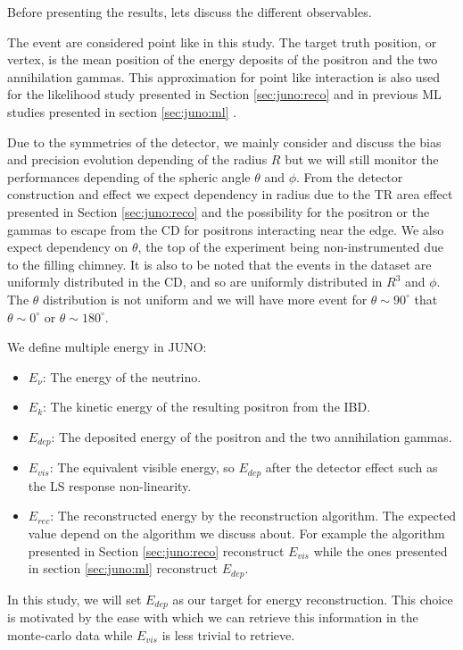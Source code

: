 \documentclass[../main.tex]{subfiles}
\begin{document}
Before presenting the results, lets discuss the different observables.

The event are considered point like in this study. The target truth position, or vertex, is the mean position of the energy deposits of the positron and the two annihilation gammas. This approximation for point like interaction is also used for the likelihood study presented in Section \ref{sec:juno:reco} and in previous ML studies presented in section \ref{sec:juno:ml} \cite{qian_vertex_2021}.

Due to the symmetries of the detector, we mainly consider and discuss the bias and precision evolution depending of the radius $R$ but we will still monitor the performances depending of the spheric angle $\theta$ and $\phi$. From the detector construction and effect we expect dependency in radius due to the TR area effect presented in Section \ref{sec:juno:reco} and the possibility for the positron or the gammas to escape from the CD for positrons interacting near the edge. We also expect dependency on $\theta$, the top of the experiment being non-instrumented due to the filling chimney. It is also to be noted that the events in the dataset are uniformly distributed in the CD, and so are uniformly distributed in $R^3$ and $\phi$. The $\theta$ distribution is not uniform and we will have more event for $\theta \sim 90^{\circ}$ that $\theta \sim 0^{\circ}$ or $\theta \sim 180^{\circ}$.

We define multiple energy in JUNO:
\begin{itemize}
  \item $E_\nu$: The energy of the neutrino.
  \item $E_k$: The kinetic energy of the resulting positron from the IBD.
  \item $E_{dep}$: The deposited energy of the positron and the two annihilation gammas.
  \item $E_{vis}$: The equivalent visible energy, so $E_{dep}$ after the detector effect such as the LS response non-linearity.
  \item $E_{rec}$: The reconstructed energy by the reconstruction algorithm. The expected value depend on the algorithm we discuss about. For example the algorithm presented in Section \ref{sec:juno:reco} reconstruct $E_{vis}$ while the ones presented in section \ref{sec:juno:ml} reconstruct $E_{dep}$.
\end{itemize}

In this study, we will set $E_{dep}$ as our target for energy reconstruction. This choice is motivated by the ease with which we can retrieve this information in the monte-carlo data while $E_{vis}$ is less trivial to retrieve.
\end{document}
